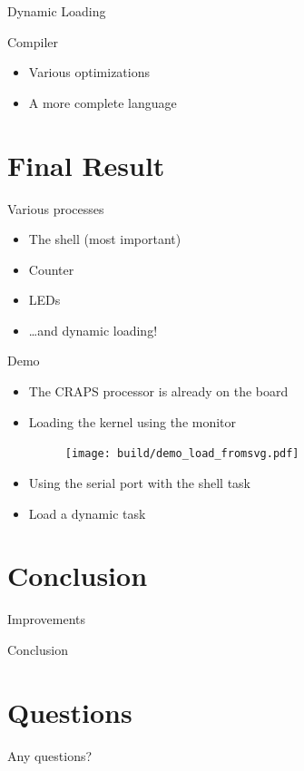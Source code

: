 \documentclass{beamer}
\begin{document}
      \begin{frame}{Dynamic Loading}
      \end{frame}

      \begin{frame}{Compiler}
        \begin{itemize}
          \item Various optimizations
          \item A more complete language
        \end{itemize}
      \end{frame}

  \section{Final Result}
    \begin{frame}{Various processes}
      \begin{itemize}
        \item The shell (most important)
        \item Counter
        \item LEDs
        \item \dots and dynamic loading!
      \end{itemize}
    \end{frame}

    \begin{frame}{Demo}
      \begin{itemize}
        \item The CRAPS processor is already on the board
        \pause
        \item Loading the kernel using the monitor
          \begin{figure}
            \centering
            \texttt{[image: build/demo\_load\_fromsvg.pdf]}
          \end{figure}
        \pause
        \item Using the serial port with the shell task
        \pause
        \item Load a dynamic task
      \end{itemize}
    \end{frame}

  \section{Conclusion}
    \begin{frame}{Improvements}
    \end{frame}

    \begin{frame}{Conclusion}
    \end{frame}

  \section{Questions}
    \begin{frame}
      Any questions?
    \end{frame}
\end{document}
